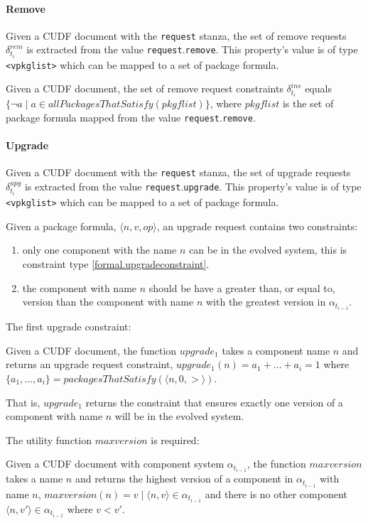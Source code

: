 \paragraph{Remove}
Given a CUDF document with the \texttt{request} stanza, the set of remove requests $\delta_{t_i}^{rem}$ is extracted from the value \texttt{request}.\texttt{remove}.
This property's value is of type \texttt{<vpkglist>} which can be mapped to a set of package formula.
\begin{defs}
Given a CUDF document, the set of remove request constraints $\delta_{t_i}^{ins}$ equals $\{ \neg a \mid a \in allPackagesThatSatisfy(pkgflist)\}$, 
where $pkgflist$ is the set of package formula mapped from the value \texttt{request}.\texttt{remove}.
\end{defs}

\paragraph{Upgrade}
Given a CUDF document with the \texttt{request} stanza, the set of upgrade requests $\delta_{t_i}^{upg}$ is extracted from the value \texttt{request}.\texttt{upgrade}.
This property's value is of type \texttt{<vpkglist>} which can be mapped to a set of package formula.

Given a package formula, $\langle n, v, op \rangle$, an upgrade request contains two constraints:
\begin{enumerate}
  \item only one component with the name $n$ can be in the evolved system, this is constraint type \ref{formal.upgradeconstraint}.
  \item the component with name $n$ should be have a greater than, or equal to, version than the component with name $n$ with the greatest version in $\alpha_{t_{i-1}}$.
\end{enumerate}

The first upgrade constraint:
\begin{defs}
Given a CUDF document, the function  $upgrade_1$ takes a component name $n$ and returns an upgrade request constraint, 
$upgrade_1(n) = a_1 + \ldots + a_i = 1$ where $\{a_1,\ldots,a_i\} = packagesThatSatisfy(\langle n,0,>\rangle)$. 
\end{defs}
That is, $upgrade_1$ returns the constraint that ensures exactly one version of a component with name $n$ will be in the evolved system.

The utility function $maxversion$ is required:
\begin{defs}
Given a CUDF document with component system $\alpha_{t_{i-1}}$, the function $maxversion$ takes a name $n$ and returns the highest version of a component in $\alpha_{t_{i-1}}$ with name $n$,
$maxversion(n) = v  \mid \langle n,v \rangle \in \alpha_{t_{i-1}}$ and there is no other component $\langle n,v' \rangle \in \alpha_{t_{i-1}}$ where $v < v'$.
\end{defs}

